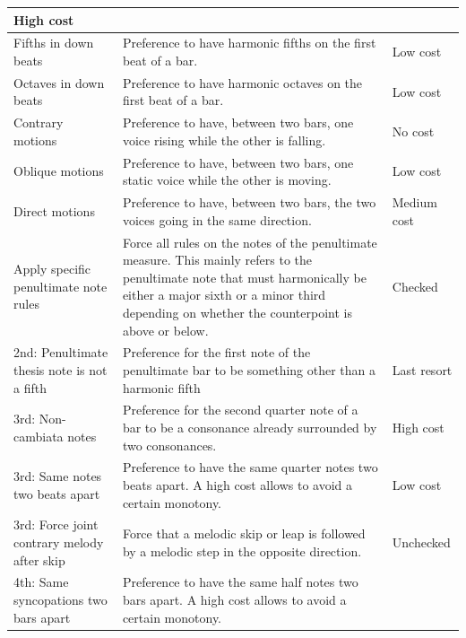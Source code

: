 \begin{table}[!h]
\begin{adjustbox}{center}
\begin{tabular}{|m{}|m{}|m{}<{\centering}|}
          High cost \\ \hline
        \cellcolor[HTML]{C8D6FF}Fifths in down beats &
          Preference to have harmonic fifths on the first beat of a bar. &
          Low cost \\ \hline
        \cellcolor[HTML]{C8D6FF}Octaves in down beats &
          Preference to have harmonic octaves on the first beat of a bar. &
          Low cost \\ \hline
        \cellcolor[HTML]{C8D6FF}Contrary motions &
          Preference to have, between two bars, one voice rising while the other is falling. &
          No cost \\ \hline
        \cellcolor[HTML]{C8D6FF}Oblique motions &
          Preference to have, between two bars, one static voice while the other is moving. &
          Low cost \\ \hline
        \cellcolor[HTML]{C8D6FF}Direct motions &
          Preference to have, between two bars, the two voices going in the same direction. &
          Medium cost \\ \hline
        \cellcolor[HTML]{C8D6FF}Apply specific penultimate note rules &
          Force all rules on the notes of the penultimate measure. This mainly refers to the penultimate note that must harmonically be either a major sixth or a minor third depending on whether the counterpoint is above or below. &
          Checked \\ \hline
        \hline
        \cellcolor[HTML]{FFCE93}2nd: Penultimate thesis note is not a fifth &
          Preference for the first note of the penultimate bar to be something other than a harmonic fifth &
          Last resort \\ \hline
        \cellcolor[HTML]{FFCE93}3rd: Non-cambiata notes &
          Preference for the second quarter note of a bar to be a consonance already surrounded by two consonances. &
          High cost \\ \hline
        \cellcolor[HTML]{FFCE93}3rd: Same notes two beats apart &
          Preference to have the same quarter notes two beats apart. A high cost allows to avoid a certain monotony. &
          Low cost \\ \hline
        \cellcolor[HTML]{FFCE93}3rd: Force joint contrary melody after skip &
          Force that a melodic skip or leap is followed by a melodic step in the opposite direction. &
          Unchecked \\ \hline
        \cellcolor[HTML]{FFCE93}4th: Same syncopations two bars apart &
          Preference to have the same half notes two bars apart. A high cost allows to avoid a certain monotony. &

\end{tabular}
\end{adjustbox}
\end{table}
